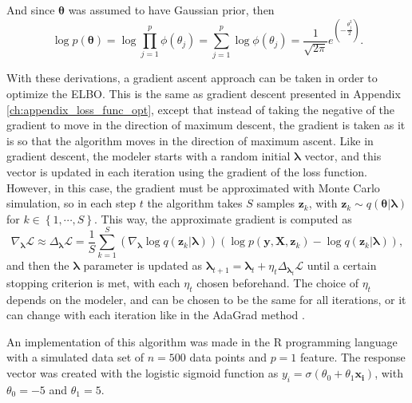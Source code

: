And since $\boldsymbol{\theta}$ was assumed to have Gaussian prior, then
\begin{equation}
  \log p(\boldsymbol{\theta}) = \log \prod_{j = 1}^p \phi(\theta_j) = \sum_{j = 1}^p \log \phi(\theta_j) = \frac{1}{\sqrt{2 \pi}} e^{\left( -\frac{\theta_j^2}{2} \right)}.
\end{equation}

With these derivations, a gradient ascent approach can be taken in order to optimize the ELBO. This is the same as gradient descent presented in Appendix \ref{ch:appendix_loss_func_opt}, except that instead of taking the negative of the gradient to move in the direction of maximum descent, the gradient is taken as it is so that the algorithm moves in the direction of maximum ascent. Like in gradient descent, the modeler starts with a random initial $\boldsymbol{\lambda}$ vector, and this vector is updated in each iteration using the gradient of the loss function. However, in this case, the gradient must be approximated with Monte Carlo simulation, so in each step $t$ the algorithm takes $S$ samples $\boldsymbol{z}_k$, with $\boldsymbol{z}_k \sim q(\boldsymbol{\theta} | \boldsymbol{\lambda})$ for $k \in \left\{1, \cdots, S \right\}$. This way, the approximate gradient is computed as
\begin{equation}
  \nabla_{\boldsymbol{\lambda}} \mathcal{L} \approx \Delta_{\boldsymbol{\lambda}} \mathcal{L} = \frac{1}{S} \sum_{k = 1}^S \left( \nabla_{\boldsymbol{\lambda}} \log q(\boldsymbol{z}_k | \boldsymbol{\lambda}) \right) \left( \log p(\boldsymbol{y}, \boldsymbol{X}, \boldsymbol{z}_k) - \log q(\boldsymbol{z}_k | \boldsymbol{\lambda}) \right),
\end{equation}
and then the $\boldsymbol{\lambda}$ parameter is updated as $\boldsymbol{\lambda}_{t+1} = \boldsymbol{\lambda}_{t} + \eta_t  \Delta_{\boldsymbol{\lambda}_t} \mathcal{L}$ until a certain stopping criterion is met, with each $\eta_t$ chosen beforehand. The choice of $\eta_t$ depends on the modeler, and can be chosen to be the same for all iterations, or it can change with each iteration like in the AdaGrad method \cite{duchi2011adaptive}.

An implementation of this algorithm was made in the R programming language with a simulated data set of $n = 500$ data points and $p = 1$ feature. The response vector was created with the logistic sigmoid function as $y_i = \sigma(\theta_0 + \theta_1 \boldsymbol{x_i})$, with $\theta_0 = -5$ and $\theta_1 = 5$.

